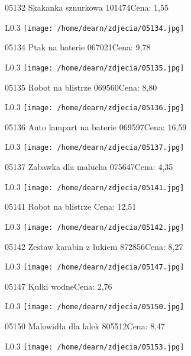 05132 Skakanka sznurkowa 101474Cena: 1,55\newline
\begin{wrapfigure}{L}{0.3\textwidth}
\texttt{[image: /home/dearn/zdjecia/05134.jpg]}
\end{wrapfigure}
05134 Ptak na baterie 067021Cena: 9,78\newline
\begin{wrapfigure}{L}{0.3\textwidth}
\texttt{[image: /home/dearn/zdjecia/05135.jpg]}
\end{wrapfigure}
05135 Robot na blistrze 069560Cena: 8,80\newline
\begin{wrapfigure}{L}{0.3\textwidth}
\texttt{[image: /home/dearn/zdjecia/05136.jpg]}
\end{wrapfigure}
05136 Auto lampart na baterie 069597Cena: 16,59\newline
\begin{wrapfigure}{L}{0.3\textwidth}
\texttt{[image: /home/dearn/zdjecia/05137.jpg]}
\end{wrapfigure}
05137 Zabawka dla malucha 075647Cena: 4,35\newline
\begin{wrapfigure}{L}{0.3\textwidth}
\texttt{[image: /home/dearn/zdjecia/05141.jpg]}
\end{wrapfigure}
05141 Robot na blistrze Cena: 12,51\newline
\begin{wrapfigure}{L}{0.3\textwidth}
\texttt{[image: /home/dearn/zdjecia/05142.jpg]}
\end{wrapfigure}
05142 Zestaw karabin z łukiem 872856Cena: 8,27\newline
\begin{wrapfigure}{L}{0.3\textwidth}
\texttt{[image: /home/dearn/zdjecia/05147.jpg]}
\end{wrapfigure}
05147 Kulki wodneCena: 2,76\newline
\begin{wrapfigure}{L}{0.3\textwidth}
\texttt{[image: /home/dearn/zdjecia/05150.jpg]}
\end{wrapfigure}
05150 Malowidła dla lalek 805512Cena: 8,47\newline
\begin{wrapfigure}{L}{0.3\textwidth}
\texttt{[image: /home/dearn/zdjecia/05153.jpg]}
\end{wrapfigure}
